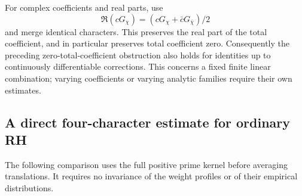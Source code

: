 For complex coefficients and real parts, use
\[
 \Re(cG_\chi)=(cG_\chi+\bar cG_{\bar\chi})/2
\]
and merge identical characters. This preserves the real part of the total
coefficient, and in particular preserves total coefficient zero.
Consequently the preceding zero-total-coefficient obstruction also
holds for identities up to continuously differentiable corrections.
This concerns a fixed finite linear combination; varying coefficients
or varying analytic families require their own estimates.

\subsection{A direct four-character estimate for ordinary RH}

The following comparison uses the full positive prime kernel before
averaging translations. It requires no invariance of the weight
profiles or of their empirical distributions.

